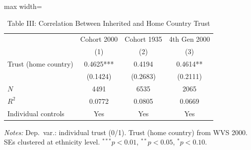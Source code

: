 \begin{table}[htbp]
\centering
\caption{Table III: Correlation Between Inherited and Home Country Trust}
\label{tab:algan_table3}
\begin{adjustbox}{max width=\textwidth}
\begin{tabular}{lccc}
\toprule
 & Cohort 2000 & Cohort 1935 & 4th Gen 2000 \\
 & (1) & (2) & (3) \\
\midrule
Trust (home country) & 0.4625*** & 0.4194 & 0.4614** \\
 & (0.1424) & (0.2683) & (0.2111) \\
\midrule
$N$ & 4491 & 6535 & 2065 \\
$R^2$ & 0.0772 & 0.0805 & 0.0669 \\
\midrule
Individual controls & Yes & Yes & Yes \\
\bottomrule
\end{tabular}
\end{adjustbox}
\parbox{\textwidth}{\footnotesize\textit{Notes:} Dep.\ var.: individual trust (0/1). Trust (home country) from WVS 2000. SEs clustered at ethnicity level. $^{***}p<0.01$, $^{**}p<0.05$, $^{*}p<0.10$.}
\end{table}